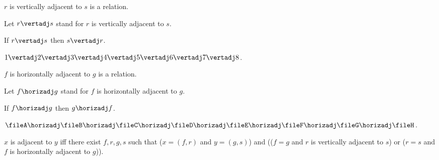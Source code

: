\begin{forthel}
    \begin{signature}
        $r$ is vertically adjacent to $s$ is a relation.
    \end{signature}
    Let $r\vertadj s$ stand for $r$ is vertically adjacent to $s$.

    \begin{axiom}
        If $r\vertadj s$ then $s\vertadj r$.
    \end{axiom}
    \begin{axiom}
        $1\vertadj 2\vertadj 3\vertadj 4\vertadj 5\vertadj 6\vertadj 7\vertadj 8$.
    \end{axiom}

    \begin{signature}
        $f$ is horizontally adjacent to $g$ is a relation.
    \end{signature}
    Let $f\horizadj g$ stand for $f$ is horizontally adjacent to $g$.

    \begin{axiom}
        If $f \horizadj g$ then $g \horizadj f$.
    \end{axiom}
    \begin{axiom}
        $\fileA \horizadj \fileB \horizadj \fileC \horizadj \fileD
        \horizadj \fileE \horizadj \fileF \horizadj \fileG \horizadj \fileH$.
    \end{axiom}



    \begin{definition}
        $x$ is adjacent to $y$ iff
        there exist $f, r, g, s$ such that
        ($x=(f,r)$ and $y=(g,s)$) and (($f=g$ and $r$ is vertically adjacent to $s$) or
        ($r=s$ and $f$ is horizontally adjacent to $g$)).
    \end{definition}


\end{forthel}
